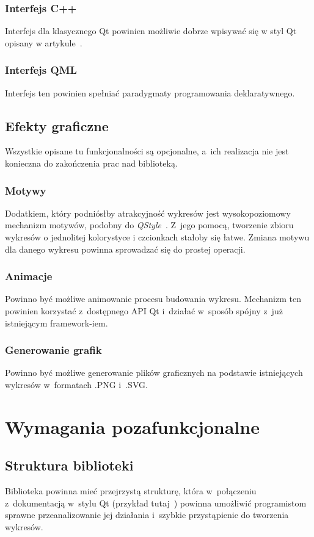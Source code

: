 \documentclass[11pt,twoside,a4paper,final]{article}
\begin{document}
\subsubsection{Interfejs C++}
Interfejs dla klasycznego Qt powinien możliwie dobrze wpisywać się w styl Qt opisany w artykule~\cite{qt-style-API}.

\subsubsection{Interfejs QML}
Interfejs ten powinien spełniać paradygmaty programowania deklaratywnego.

\subsection{Efekty graficzne}
Wszystkie opisane tu funkcjonalności są opcjonalne, a~ich realizacja nie jest konieczna do zakończenia prac nad biblioteką.

\subsubsection{Motywy}
Dodatkiem, który podniósłby atrakcyjność wykresów jest wysokopoziomowy mechanizm motywów, podobny do \textit{QStyle}~\cite{qstyle}. Z~jego pomocą, tworzenie zbioru wykresów o jednolitej kolorystyce i czcionkach stałoby się łatwe. Zmiana motywu dla danego wykresu powinna sprowadzać się do prostej operacji.

\subsubsection{Animacje}
Powinno być możliwe animowanie procesu budowania wykresu. Mechanizm ten powinien korzystać z~dostępnego API Qt\cite{qt-anim} i~działać w~sposób spójny z~już istniejącym framework-iem.

\subsubsection{Generowanie grafik}
Powinno być możliwe generowanie plików graficznych na podstawie istniejących wykresów w~formatach .PNG i~.SVG.



\section{Wymagania pozafunkcjonalne}


\subsection{Struktura biblioteki}
Biblioteka powinna mieć przejrzystą strukturę, która w~połączeniu z~dokumentacją w~stylu Qt (przykład tutaj~\cite{qt-doc}) powinna umożliwić programistom sprawne przeanalizowanie jej działania i~szybkie przystąpienie do tworzenia wykresów.
\end{document}
